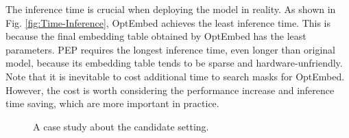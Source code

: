 \documentclass[sigconf]{acmart}
\begin{document}
The inference time is crucial when deploying the model in reality. As shown in Fig. \ref{fig:Time-Inference}, OptEmbed achieves the least inference time. This is because the final embedding table obtained by OptEmbed has the least parameters. PEP requires the longest inference time, even longer than original model, because its embedding table tends to be sparse and hardware-unfriendly. 
Note that it is inevitable to cost additional time to search masks for OptEmbed. However, the cost is worth considering the performance increase and inference time saving, which are more important in practice.

\begin{figure}[!htbp]
    \centering
    \vspace{-10pt}
    \caption{A case study about the candidate setting.}
    \vspace{-10pt}
    \label{fig:Time}
\end{figure}
\end{document}
